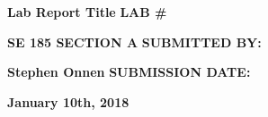 \documentclass{article}
\begin{document}

\begin{titlepage} 
\begin{center}
\vspace*{\fill}
%
%
\Huge\textbf{Lab Report Title}
\vskip 0.5in
\pagecolor{bgcolor}
%
%
\Large\textbf{LAB \#} \par
\LARGE\color{gvred}\textbf{SE 185 SECTION A}
\vskip 0.5in
\large\color{gvbgdark}\textbf{SUBMITTED BY:} \par
%
%
\LARGE\color{gvred}\textbf{Stephen Onnen}
\vskip 0.5in
\large\color{gvbgdark}\textbf{SUBMISSION DATE:} \par
%
%
\LARGE\color{gvred}\textbf{January 10th, 2018}
\vspace*{\fill}
\end{center}
\end{titlepage}
\end{document}
